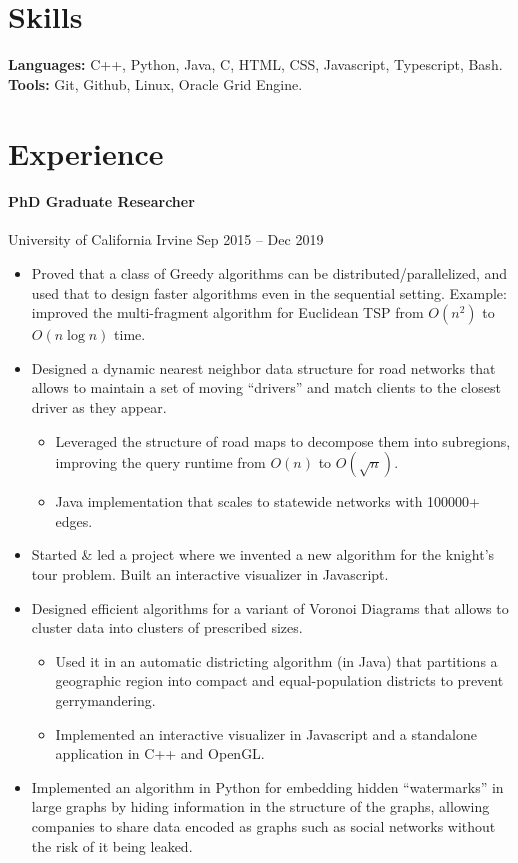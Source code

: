 \documentclass[letterpaper,10pt,oneside]{article}
\newcommand{\note}[1]{}
\begin{document}
\section*{Skills}
\textbf{Languages:} C++, Python, Java, C, HTML, CSS, Javascript, Typescript, Bash.~
\textbf{Tools:} Git, Github, Linux, Oracle Grid Engine.

\section*{Experience}
\paragraph*{PhD Graduate Researcher} University of California Irvine \hfill Sep 2015 -- Dec 2019
\begin{itemize}[leftmargin=15px]
\item Proved that a class of Greedy algorithms can be distributed/parallelized, and used that to design faster algorithms even in the sequential setting. Example: improved the multi-fragment algorithm for Euclidean TSP from $O(n^2)$ to $O(n\log n)$ time.
\item Designed a dynamic nearest neighbor data structure for road networks that allows to maintain a set of moving  ``drivers'' and match clients to the closest driver as they appear.
	\begin{itemize}[leftmargin=15px,topsep=0px]
		\item Leveraged the structure of road maps to decompose them into subregions, improving the query runtime from $O(n)$ to $O(\sqrt{n})$.\note{should I use big O notation in a resume?}
		\item Java implementation that scales to statewide networks with 100000+ edges. \note{quantification}      
	\end{itemize}
\item Started \& led a project where we invented a new algorithm for the knight's tour problem. Built an interactive visualizer in Javascript.
\item Designed efficient algorithms for a variant of Voronoi Diagrams that allows to cluster data into clusters of prescribed sizes.
	\begin{itemize}[leftmargin=15px,topsep=0px]
		\item Used it in an automatic districting algorithm (in Java) that partitions a geographic region into compact and equal-population districts to prevent gerrymandering.\note{context}
		\item Implemented an interactive visualizer in Javascript and a standalone application in C++ and OpenGL.\note{keywords}
	\end{itemize}
\item Implemented an algorithm in Python for embedding hidden ``watermarks'' in large graphs by hiding information in the structure of the graphs, allowing companies to share data encoded as graphs such as social networks without the risk of it being leaked.\note{context}
\end{itemize}
\end{document}

